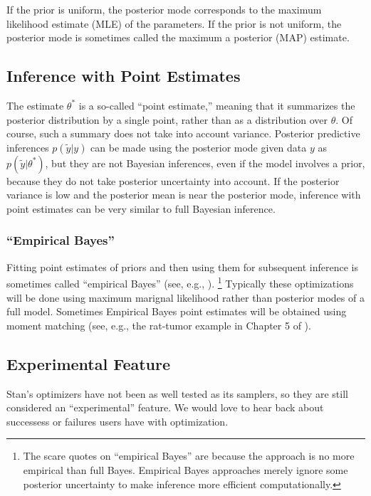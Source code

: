 If the prior is uniform, the posterior mode corresponds to the maximum
likelihood estimate (MLE) of the parameters.  If the prior is not
uniform, the posterior mode is sometimes called the maximum a
posterior (MAP) estimate.  


\subsection{Inference with Point Estimates}

The estimate $\theta^{*}$ is a so-called ``point estimate,'' meaning
that it summarizes the posterior distribution by a single point,
rather than as a distribution over $\theta$.  Of course, such a
summary does not take into account variance.  Posterior predictive
inferences $p(\tilde{y} | y)$ can be made using the posterior mode
given data $y$ as $p(\tilde{y}|\theta^*)$, but they are not Bayesian
inferences, even if the model involves a prior, because they do not
take posterior uncertainty into account.  If the posterior variance is
low and the posterior mean is near the posterior mode, inference with
point estimates can be very similar to full Bayesian inference.

\subsubsection{``Empirical Bayes''}

Fitting point estimates of priors and then using them for subsequent
inference is sometimes called ``empirical Bayes'' (see, e.g.,
\citep{Efron:2012}).%
%
\footnote{The scare quotes on ``empirical Bayes'' are because the
  approach is no more empirical than full Bayes.  Empirical Bayes
  approaches merely ignore some posterior uncertainty to make
  inference more efficient computationally.}
%
Typically these optimizations will be done using maximum marignal
likelihood rather than posterior modes of a full model.  Sometimes
Empirical Bayes point estimates will be obtained using moment matching
(see, e.g., the rat-tumor example in Chapter 5 of
\citep{GelmanCarlinSternRubin:2003}).


\subsection{Experimental Feature}

Stan's optimizers have not been as well tested as its samplers, so
they are still considered an ``experimental'' feature.  We would love
to hear back about successess or failures users have with
optimization.  



